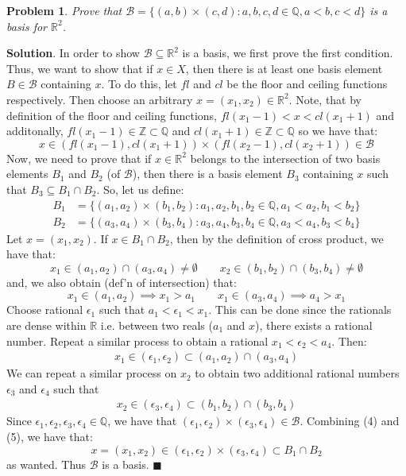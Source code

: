 \documentclass[12pt]{article}
\renewcommand{\=}[1]{\stackrel{#1}{=}} %
\providecommand{\RR}{\mathbb{R}}
\providecommand{\QQ}{\mathbb{Q}}
\newtheorem{p}{Problem}[section]
\theoremstyle{definition}
\newenvironment{s}{%
        \begin{trivlist} \item \textbf{Solution}. }{%
            \hspace*{\fill} $\blacksquare$\end{trivlist}}%
\begin{document}
\begin{p}
    Prove that $\mathcal{B} = \{(a,b)\times(c,d):a,b,c,d\in\QQ, a<b,c<d\}$ is a basis for $\RR^2$.
\end{p}
\begin{s}
    In order to show $\mathcal{B}\subseteq\RR^2$ is a basis, we first prove the first condition. Thus, we want to show that
    if $x\in X$, then there is at least one basis element $B\in\mathcal{B}$ containing $x$. To do this, let $fl$ and $cl$
    be the floor and ceiling functions respectively. Then choose an arbitrary $x=(x_1,x_2)\in\RR^2$. Note, that by
    definition of the floor and ceiling functions, $fl(x_1-1) < x < cl(x_1+1)$ and additonally, $fl(x_1-1)\in\mathbb{Z}\subset\QQ$
    and $cl(x_1+1)\in\mathbb{Z}\subset\QQ$ so we have that:
    \[ x\in (fl(x_1-1),cl(x_1+1))\times(fl(x_2-1),cl(x_2+1))\in\mathcal{B}\]
    Now, we need to prove that if $x\in\RR^2$ belongs to the intersection of two basis elements $B_1$ and
    $B_2$ (of $\mathcal{B}$), then there is a basis element $B_3$ containing $x$ such that $B_3\subseteq B_1\cap B_2$.
    So, let us define:
    \begin{align*}
        B_1 &= \{(a_1,a_2)\times(b_1,b_2):a_1,a_2,b_1,b_2\in\QQ, a_1<a_2,b_1<b_2\} \\
        B_2 &= \{(a_3,a_4)\times(b_3,b_4):a_3,a_4,b_3,b_4\in\QQ, a_3<a_4,b_3<b_4\}
    \end{align*}
    Let $x = (x_1,x_2)$. If $x\in B_1\cap B_2$, then by the definition of cross product, we have that:
    \[ x_1\in (a_1,a_2)\cap(a_3,a_4)\neq\emptyset \qquad x_2\in(b_1,b_2)\cap(b_3,b_4)\neq\emptyset \]
    and, we also obtain (def'n of intersection) that:
    \[ x_1 \in (a_1,a_2) \implies x_1 > a_1 \qquad x_1\in (a_3,a_4) \implies a_4 > x_1 \]
    Choose rational $\epsilon_1$ such that $a_1 < \epsilon_1 < x_1$. This can be done since the rationals are dense within $\RR$ i.e. between two
    reals ($a_1$ and $x$), there exists a rational number. Repeat a similar process to obtain a rational $x_1 < \epsilon_2 < a_4$. Then:
    \begin{align}
        x_1 \in (\epsilon_1,\epsilon_2) \subset (a_1,a_2)\cap(a_3,a_4)
    \end{align}
    We can repeat a similar process on $x_2$ to
    obtain two additional rational numbers $\epsilon_3$ and $\epsilon_4$ such that 
    \begin{align}
        x_2\in(\epsilon_3,\epsilon_4)\subset(b_1,b_2)\cap(b_3,b_4)
    \end{align}
    Since $\epsilon_1,\epsilon_2,\epsilon_3,\epsilon_4\in\QQ$, we have that 
    $(\epsilon_1,\epsilon_2)\times(\epsilon_3,\epsilon_4)\in\mathcal{B}$. Combining (4) and (5), we have that:
    \[ x = (x_1,x_2) \in (\epsilon_1,\epsilon_2)\times(\epsilon_3,\epsilon_4)\subset B_1\cap B_2 \]
    as wanted. Thus $\mathcal{B}$ is a basis.
\end{s}
\end{document}
